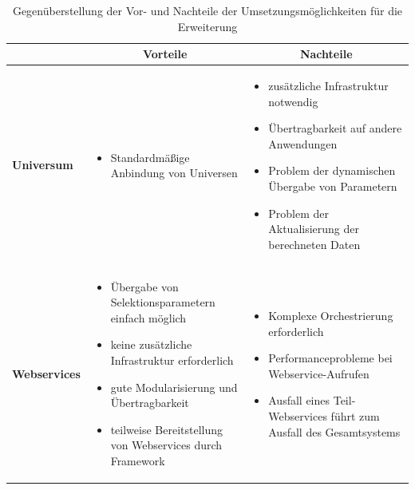 \begin{onehalfspacing}
\begin{table}[ht]
\centering
\begin{tabular}{p{25mm}|p{55mm}|p{55mm}}
& \multicolumn{1}{c|}{\textbf{Vorteile}} & \multicolumn{1}{c}{\textbf{Nachteile}} \tabularnewline \hline
\begin{description}[leftmargin=0pt, topsep=0pt, itemsep=1pt] 
\item \textbf{Universum}
\end{description}
&
\begin{itemize}[leftmargin=*, topsep=0pt, itemsep=1pt] 
\item Standardmäßige Anbindung von Universen
\end{itemize}
&
\begin{itemize}[leftmargin=*, topsep=0pt, itemsep=1pt] 
\item zusätzliche Infrastruktur notwendig
\item Übertragbarkeit auf andere Anwendungen
\item Problem der dynamischen Übergabe von Parametern
\item Problem der Aktualisierung der berechneten Daten
\end{itemize}
\tabularnewline \hline
\begin{description}[leftmargin=0pt, topsep=0pt, itemsep=1pt] 
\item \textbf{Webservices}
\end{description}
&
\begin{itemize}[leftmargin=*, topsep=0pt, itemsep=1pt] 
\item Übergabe von Selektionsparametern einfach möglich
\item keine zusätzliche Infrastruktur erforderlich
\item gute Modularisierung und Übertragbarkeit
\item teilweise Bereitstellung von Webservices durch Framework
\end{itemize}
&
\begin{itemize}[leftmargin=*, topsep=0pt, itemsep=1pt] 
\item Komplexe Orchestrierung erforderlich
\item Performanceprobleme bei Web\-ser\-vice-\-Aufrufen
\item Ausfall eines Teil-Webservices führt zum Ausfall des Gesamtsystems
\end{itemize}
\tabularnewline
\end{tabular}
\caption{Gegenüberstellung der Vor- und Nachteile der Umsetzungsmöglichkeiten für die Erweiterung \label{table:vergleich_umsetzung}}
\end{table}


\end{onehalfspacing}
